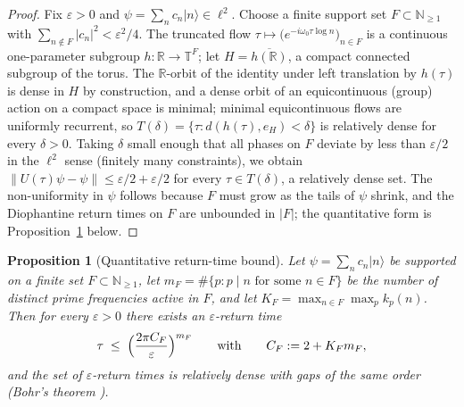 \documentclass[11pt,a4paper]{article}
\theoremstyle{plain}
\newtheorem{proposition}[theorem]{Proposition}
\theoremstyle{definition}
\theoremstyle{remark}
\newcommand{\ket}[1]{\lvert #1\rangle}
\newcommand{\Nn}{\mathbb{N}}
\newcommand{\Rr}{\mathbb{R}}
\begin{document}
\begin{proof}
Fix $\varepsilon>0$ and $\psi=\sum_{n}c_{n}\ket{n}\in\ell^{2}$. Choose a finite support set
$F\subset\Nn_{\geq1}$ with $\sum_{n\notin F}|c_{n}|^{2}<\varepsilon^{2}/4$. The truncated
flow $\tau\mapsto\bigl(e^{-i\omega_{0}\tau\log n}\bigr)_{n\in F}$ is a continuous
one-parameter subgroup $h\colon\Rr\to\mathbb{T}^{F}$; let
$H=\overline{h(\Rr)}$, a compact connected subgroup of the torus. The $\Rr$-orbit of the
identity under left translation by $h(\tau)$ is dense in $H$ by construction, and a dense
orbit of an equicontinuous (group) action on a compact space is minimal; minimal
equicontinuous flows are uniformly recurrent, so
$T(\delta)=\{\tau:d(h(\tau),e_{H})<\delta\}$ is relatively dense for every $\delta>0$.
Taking $\delta$ small enough that all phases on $F$ deviate by less than $\varepsilon/2$
in the $\ell^{2}$ sense (finitely many constraints), we obtain
$\|U(\tau)\psi-\psi\|\leq\varepsilon/2+\varepsilon/2$ for every $\tau\in T(\delta)$, a
relatively dense set. The non-uniformity in $\psi$ follows because $F$ must grow as the
tails of $\psi$ shrink, and the Diophantine return times on $F$ are unbounded in $|F|$; the
quantitative form is Proposition~\ref{prop:returnbound} below.
\end{proof}

\begin{proposition}[Quantitative return-time bound]\label{prop:returnbound}
Let $\psi=\sum_{n}c_{n}\ket{n}$ be supported on a finite set $F\subset\Nn_{\geq1}$, let
$m_{F}=\#\{p: p\mid n \text{ for some } n\in F\}$ be the number of distinct prime
frequencies active in $F$, and let $K_{F}=\max_{n\in F}\max_{p}k_{p}(n)$. Then for every
$\varepsilon>0$ there exists an $\varepsilon$-return time
\begin{equation}\label{eq:returnbound}
\tau\;\leq\;\Bigl(\frac{2\pi C_{F}}{\varepsilon}\Bigr)^{m_{F}}
\qquad\text{with}\qquad C_{F}:=2+K_{F}m_{F},
\end{equation}
and the set of $\varepsilon$-return times is relatively dense with gaps of the same order
(Bohr's theorem \cite{besicovitch1932}).
\end{proposition}
\end{document}
